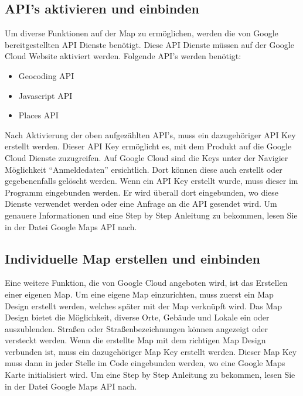 \subsection{API's aktivieren und einbinden}
Um diverse Funktionen auf der Map zu ermöglichen, werden die von Google bereitgestellten API Dienste benötigt.  Diese API Dienste müssen auf der Google Cloud Website aktiviert werden. Folgende API's werden benötigt:
\begin{itemize}
	\item Geocoding API 
	\item Javascript API
	\item Places API  
\end{itemize}
Nach Aktivierung der oben aufgezählten API's, muss ein dazugehöriger API Key erstellt werden. Dieser API Key ermöglicht es, mit dem Produkt auf die Google Cloud Dienste zuzugreifen. Auf Google Cloud sind die Keys unter der Navigier Möglichkeit  “Anmeldedaten” ersichtlich. Dort können diese auch  erstellt oder gegebenenfalls gelöscht werden. Wenn ein API Key erstellt wurde, muss dieser im Programm eingebunden werden. Er wird überall dort eingebunden, wo diese Dienste verwendet werden oder eine Anfrage an die API gesendet wird. Um genauere Informationen und eine Step by Step Anleitung zu bekommen, lesen Sie in der Datei Google Maps API nach.

\newpage
\subsection{Individuelle Map erstellen und einbinden}
Eine weitere Funktion, die von Google Cloud angeboten wird, ist das Erstellen einer eigenen Map. 
Um eine eigene Map einzurichten, muss zuerst ein Map Design erstellt werden, welches später mit der Map verknüpft wird. Das Map Design bietet die Möglichkeit, diverse Orte, Gebäude und Lokale  ein oder auszublenden. Straßen oder Straßenbezeichnungen können angezeigt oder versteckt werden. Wenn die erstellte Map mit dem richtigen Map Design verbunden ist, muss ein dazugehöriger Map Key erstellt werden. Dieser Map Key muss dann in jeder Stelle im Code eingebunden werden, wo eine Google Maps Karte initialisiert wird. Um eine Step by Step Anleitung zu bekommen, lesen Sie in der Datei Google Maps API nach.



